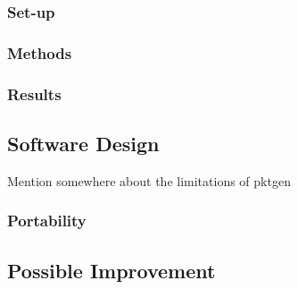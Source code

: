 \documentclass[final_report.tex]{subfiles}
\begin{document}

\subsubsection{Set-up}

\subsubsection{Methods}

\subsubsection{Results}

\subsection{Software Design}
Mention somewhere about the limitations of pktgen

\subsubsection{Portability}

\subsection{Possible Improvement}
\end{document}
